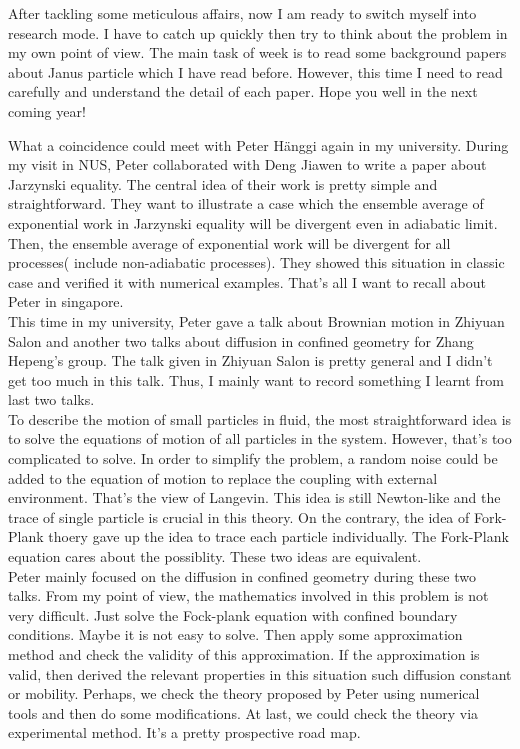 \documentclass[fontsize=11pt, %
                             paper=a4, %
                             twoside, %
                             captions=tableheading,
                             index=totoc,
                             hyperref]{labbook}
\begin{document}
\begin{addmargin}[4cm]{0cm}
After tackling some meticulous affairs, now I am ready to switch myself into research mode. I have to catch up quickly then try to think about the problem in my own point of view. The main task of week is to read some background papers\cite{ChiangVelegol2014,Fixman1980,Kline2006,OBrienWhite1978,RobertJ.HunterRowell1981,Teubner1982} about Janus particle which I have read before. However, this time I need to read carefully and understand the detail of each paper. Hope you well in the next coming year!

What a coincidence could meet with Peter H{\"a}nggi again in my university. During my visit in NUS, Peter collaborated with Deng Jiawen to write a paper about Jarzynski equality\cite{Jarzynski1997a}. The central idea of their work is pretty simple and straightforward. They want to illustrate a case which the ensemble average of exponential work in Jarzynski equality will be divergent even in adiabatic limit. Then, the ensemble average of exponential work will be divergent for all processes( include non-adiabatic processes). They showed this situation in classic case and verified it with numerical examples. That's all I want to recall about Peter in singapore. \\
This time in my university, Peter gave a talk about Brownian motion in Zhiyuan Salon and another two talks about diffusion in confined geometry \cite{burada2009diffusion} for Zhang Hepeng's group. The talk given in Zhiyuan Salon is pretty general and I didn't get too much in this talk. Thus, I mainly want to record something I learnt from last two talks.\\
To describe the motion of small particles in fluid, the most straightforward idea is to solve the equations of motion of all particles in the system. However, that's too complicated to solve. In order to simplify the problem, a random noise could be added to the equation of motion to replace the coupling with external environment. That's the view of Langevin. This idea is still Newton-like and the trace of single particle is crucial in this theory. On the contrary, the idea of Fork-Plank thoery gave up the idea to trace each particle individually. The Fork-Plank equation cares about the possiblity. These two ideas are equivalent.\\
Peter mainly focused on the diffusion in confined geometry during these two talks. From my point of view, the mathematics involved in this problem is not very difficult. Just solve the Fock-plank equation with confined boundary conditions. Maybe it is not easy to solve. Then apply some approximation method and check the validity of this approximation. If the approximation is valid, then derived the relevant properties in this situation such diffusion constant or mobility. Perhaps, we check the theory proposed by Peter using numerical tools and then do some modifications. At last, we could check the theory via experimental method. It's a pretty prospective road map. \\

\end{addmargin}
\end{document}
